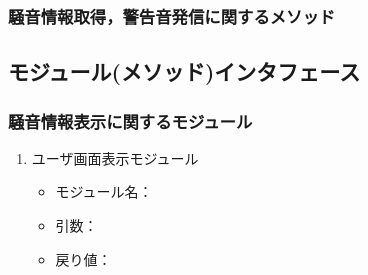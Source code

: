 \subsubsection{騒音情報取得，警告音発信に関するメソッド}

\subsection{モジュール(メソッド)インタフェース}
\subsubsection{騒音情報表示に関するモジュール}
\begin{enumerate}
\renewcommand{\labelenumi}{(\arabic{enumi})}
\item ユーザ画面表示モジュール

\begin{itemize}
\item モジュール名：
\item 引数：
\item 戻り値：
\end{itemize}



\end{enumerate}
